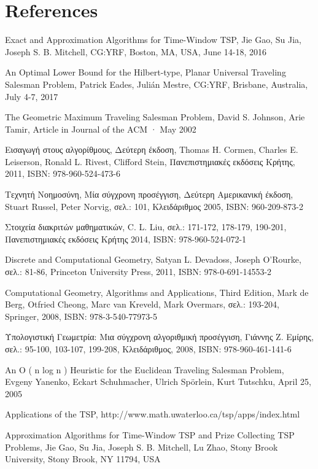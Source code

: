 \documentclass[oneside,12pt]{book}
\theoremstyle{definition}
\begin{document}
\chapter{References}
\begin{thebibliography}{depth}
	Exact and Approximation Algorithms for Time-Window TSP,
	Jie Gao, Su Jia, Joseph S. B. Mitchell,
	CG:YRF, Boston, MA, USA, June 14-18, 2016

	An Optimal Lower Bound for the Hilbert-type, Planar Universal Traveling Salesman Problem,
	Patrick Eades, Julián Mestre,
	CG:YRF, Brisbane, Australia, July 4-7, 2017

	The Geometric Maximum Traveling Salesman Problem,
	David S. Johnson, Arie Tamir,
	Article in Journal of the ACM · May 2002

	Εισαγωγή στους αλγορίθμους, Δεύτερη έκδοση,
	Thomas H. Cormen, Charles E. Leiserson, Ronald L. Rivest, Clifford Stein,
	Πανεπιστημιακές εκδόσεις Κρήτης, 2011,
	ISBN: 978-960-524-473-6

	Τεχνητή Νοημοσύνη, Μία σύγχρονη προσέγγιση, Δεύτερη Αμερικανική έκδοση,
	Stuart Russel, Peter Norvig,
	σελ.: 101,
	Κλειδάριθμος 2005,
	ISBN: 960-209-873-2

	Στοιχεία διακριτών μαθηματικών,
	C. L. Liu,
	σελ.: 171-172, 178-179, 190-201,
	Πανεπιστημιακές εκδόσεις Κρήτης 2014,
	ISBN: 978-960-524-072-1

	Discrete and Computational Geometry,
	Satyan L. Devadoss, Joseph O'Rourke,
	σελ.: 81-86,
	Princeton University Press, 2011,
	ISBN: 978-0-691-14553-2

	Computational Geometry,	Algorithms and Applications, Third Edition,
	Mark de Berg, Otfried Cheong, Marc van Kreveld, Mark Overmars,
	σελ.: 193-204,
	Springer, 2008,
	ISBN: 978-3-540-77973-5

	Υπολογιστική Γεωμετρία: Μια σύγχρονη αλγοριθμική προσέγγιση,
	Γιάννης Ζ. Εμίρης,
	σελ.: 95-100, 103-107, 199-208,
	Κλειδάριθμος, 2008,
	ISBN: 978-960-461-141-6

	An O ( n log n ) Heuristic for the Euclidean Traveling Salesman Problem,
	Evgeny Yanenko, Eckart
	Schuhmacher, Ulrich Spörlein, Kurt Tutschku,
	April 25, 2005

	Applications of the TSP,
	http://www.math.uwaterloo.ca/tsp/apps/index.html

	Approximation Algorithms for Time-Window
	TSP and Prize Collecting TSP Problems,
	Jie Gao, Su Jia, Joseph S. B. Mitchell, Lu Zhao,
	Stony Brook University, Stony Brook, NY 11794, USA


\end{thebibliography}
\end{document}
